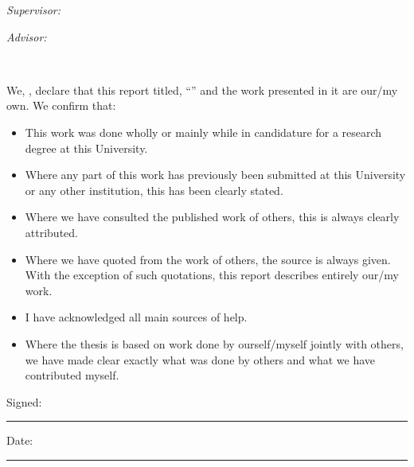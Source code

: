\documentclass[
11pt, %
english, %
singlespacing, %
headsepline, %
]{mediaproject} %
\begin{document}
\begin{titlepage}
\begin{center}
 \begin{minipage}[t]{0.4\textwidth}
     \begin{flushleft} \large
         \emph{Supervisor:}\\
         \href{https://www.tu-ilmenau.de/vwds/team/wolfgang-broll/}{\supname}
     \end{flushleft}
 \end{minipage}
 \begin{minipage}[t]{0.4\textwidth}
     \begin{flushright} \large
         \emph{Advisor:} \\
         \href{https://www.tu-ilmenau.de/vwds/team/christian-kunert/}{\examname} 
     \end{flushright}
 \end{minipage}\\[3cm]

\vfill
\end{center}
\end{titlepage}


\begin{declaration}
\addchaptertocentry{\authorshipname} %
\noindent We, \authorname, declare that this report titled, \enquote{\ttitle} and the work presented in it are our/my own. We confirm that:

\begin{itemize} 
\item This work was done wholly or mainly while in candidature for a research degree at this University.
\item Where any part of this work has previously been submitted at this University or any other institution, this has been clearly stated.
\item Where we have consulted the published work of others, this is always clearly attributed.
\item Where we have quoted from the work of others, the source is always given. With the exception of such quotations, this report describes entirely our/my work.
\item I have acknowledged all main sources of help.
\item Where the thesis is based on work done by ourself/myself jointly with others, we have made clear exactly what was done by others and what we have contributed myself.
\end{itemize}
 
\noindent Signed:\\
\rule[0.5em]{25em}{0.5pt} %
 
\noindent Date:\\
\rule[0.5em]{25em}{0.5pt} %
\end{declaration}
\end{document}
